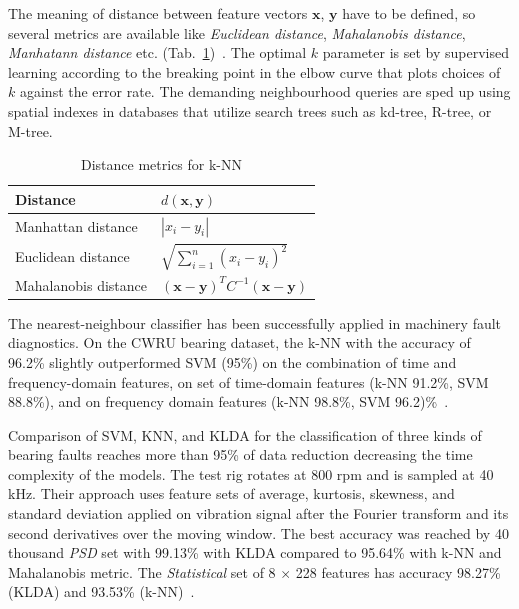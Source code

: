 The meaning of distance between feature vectors $\mathbf{x}$, $\mathbf{y}$ have to be defined, so several metrics are available like \emph{Euclidean distance}, \emph{Mahalanobis distance}, \emph{Manhatann distance} etc. (Tab.~\ref{tab:KNN-distance})~\cite{sheng_review_2020, abu_alfeilat_effects_2019}. The optimal $k$ parameter is set by supervised learning according to the breaking point in the elbow curve that plots choices of $k$ against the error rate. The demanding neighbourhood queries are sped up using spatial indexes in databases that utilize search trees such as kd-tree, R-tree, or M-tree.

\begin{table}[ht]
\centering
\renewcommand{\arraystretch}{2}
\begin{tabular}{|l|l|}
\hline
\textbf{Distance}     & \textbf{$d(\mathbf{x}, \mathbf{y})$}                                   \\ \hline
Manhattan distance	 & $ |x_i - y_i| $													   \\ \hline
Euclidean distance    & $ \sqrt{\sum_{i = 1}^{n}(x_i - y_i)^2} $                               \\ \hline
Mahalanobis distance  & $ (\mathbf{x} - \mathbf{y})^T C^{-1} (\mathbf{x} - \mathbf{y}) $       \\ \hline
\end{tabular}
\caption{Distance metrics for k-NN}
\label{tab:KNN-distance}
\end{table}

The nearest-neighbour classifier has been successfully applied in machinery fault diagnostics. On the CWRU bearing dataset, the k-NN with the accuracy of 96.2\% slightly outperformed SVM (95\%) on the combination of time and frequency-domain features, on set of time-domain features (k-NN 91.2\%, SVM 88.8\%), and on frequency domain features (k-NN 98.8\%, SVM 96.2)\%~\cite{jamil_feature-based_2021}.

Comparison of SVM, KNN, and KLDA for the classification of three kinds of bearing faults reaches more than 95\% of data reduction decreasing the time complexity of the models. The test rig rotates at 800 rpm and is sampled at 40 kHz. Their approach uses feature sets of average, kurtosis, skewness, and standard deviation applied on vibration signal after the Fourier transform and its second derivatives over the moving window. The best accuracy was reached by 40 thousand \emph{PSD} set with 99.13\% with KLDA compared to 95.64\% with k-NN and Mahalanobis metric. The \emph{Statistical} set of 8 $\times$ 228 features has accuracy 98.27\% (KLDA) and 93.53\% (k-NN)~\cite{altaf_new_2022}.

